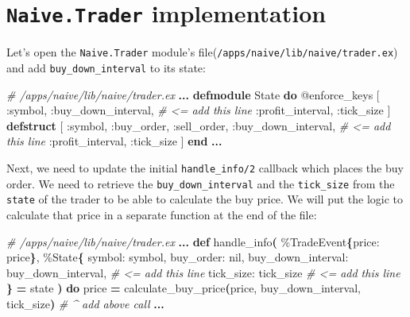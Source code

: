\documentclass[
  oneside]{book}
\newenvironment{Shaded}{\begin{snugshade}}{\end{snugshade}}
\newcommand{\CommentTok}[1]{\textcolor[rgb]{0.56,0.35,0.01}{\textit{#1}}}
\newcommand{\ConstantTok}[1]{\textcolor[rgb]{0.56,0.35,0.01}{#1}}
\newcommand{\FunctionTok}[1]{\textcolor[rgb]{0.13,0.29,0.53}{\textbf{#1}}}
\newcommand{\KeywordTok}[1]{\textcolor[rgb]{0.13,0.29,0.53}{\textbf{#1}}}
\newcommand{\NormalTok}[1]{#1}
\newcommand{\OperatorTok}[1]{\textcolor[rgb]{0.81,0.36,0.00}{\textbf{#1}}}
\newcommand{\OtherTok}[1]{\textcolor[rgb]{0.56,0.35,0.01}{#1}}
\newcommand{\VariableTok}[1]{\textcolor[rgb]{0.00,0.00,0.00}{#1}}
\begin{document}
\section{\texorpdfstring{\texttt{Naive.Trader} implementation}{Naive.Trader implementation}}\label{naive.trader-implementation}

Let's open the \texttt{Naive.Trader} module's file(\texttt{/apps/naive/lib/naive/trader.ex}) and add \texttt{buy\_down\_interval} to its state:

\begin{Shaded}
\begin{Highlighting}[]
  \CommentTok{\# /apps/naive/lib/naive/trader.ex}
  \OperatorTok{...}
  \KeywordTok{defmodule} \ConstantTok{State} \KeywordTok{do}
    \OtherTok{@enforce\_keys} \OtherTok{[}
      \VariableTok{:symbol}\NormalTok{,}
      \VariableTok{:buy\_down\_interval}\NormalTok{, }\CommentTok{\# \textless{}= add this line}
      \VariableTok{:profit\_interval}\NormalTok{,}
      \VariableTok{:tick\_size}
    \OtherTok{]}
    \KeywordTok{defstruct} \OtherTok{[}
      \VariableTok{:symbol}\NormalTok{,}
      \VariableTok{:buy\_order}\NormalTok{,}
      \VariableTok{:sell\_order}\NormalTok{,}
      \VariableTok{:buy\_down\_interval}\NormalTok{, }\CommentTok{\# \textless{}= add this line}
      \VariableTok{:profit\_interval}\NormalTok{,}
      \VariableTok{:tick\_size}
    \OtherTok{]}
  \KeywordTok{end}
  \OperatorTok{...}
\end{Highlighting}
\end{Shaded}

Next, we need to update the initial \texttt{handle\_info/2} callback which places the buy order. We need to retrieve the \texttt{buy\_down\_interval} and the \texttt{tick\_size} from the \texttt{state} of the trader to be able to calculate the buy price. We will put the logic to calculate that price in a separate function at the end of the file:

\begin{Shaded}
\begin{Highlighting}[]
  \CommentTok{\# /apps/naive/lib/naive/trader.ex}
  \OperatorTok{...}
  \KeywordTok{def}\NormalTok{ handle\_info}\FunctionTok{(}
\NormalTok{        \%}\ConstantTok{TradeEvent}\FunctionTok{\{}\VariableTok{price:}\NormalTok{ price}\FunctionTok{\}}\NormalTok{,}
\NormalTok{        \%}\ConstantTok{State}\FunctionTok{\{}
          \VariableTok{symbol:}\NormalTok{ symbol,}
          \VariableTok{buy\_order:} \ConstantTok{nil}\NormalTok{,}
          \VariableTok{buy\_down\_interval:}\NormalTok{ buy\_down\_interval, }\CommentTok{\# \textless{}= add this line}
          \VariableTok{tick\_size:}\NormalTok{ tick\_size                  }\CommentTok{\# \textless{}= add this line          }
        \FunctionTok{\}} \OperatorTok{=}\NormalTok{ state}
      \FunctionTok{)} \KeywordTok{do}
\NormalTok{    price }\OperatorTok{=}\NormalTok{ calculate\_buy\_price}\FunctionTok{(}\NormalTok{price, buy\_down\_interval, tick\_size}\FunctionTok{)}
    \CommentTok{\# \^{} add above call}
    \OperatorTok{...}
\end{Highlighting}
\end{Shaded}
\end{document}
